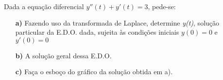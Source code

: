 \linespread{1.5}
Dada a equação diferencial $y''(t) + y'(t) = 3$, pede-se:
\begin{itemize}
    \item[\textbf{a)}] Fazendo uso da transformada de Laplace, determine \textit{y(t)}, solução particular da E.D.O. dada, sujeita às condições iniciais $y(0) = 0$ e $y'(0) = 0$
    \item[\textbf{b)}] A solução geral dessa E.D.O.
    \item[\textbf{c)}] Faça o esboço do gráfico da solução obtida em a).
\end{itemize}
